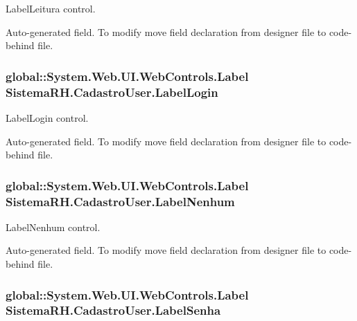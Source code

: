 LabelLeitura control. 

Auto-\/generated field. To modify move field declaration from designer file to code-\/behind file. \hypertarget{class_sistema_r_h_1_1_cadastro_user_a886a753f3edbe32db892c14f54480907}{
\subsubsection[{LabelLogin}]{\setlength{\rightskip}{0pt plus 5cm}global::System.Web.UI.WebControls.Label {\bf SistemaRH.CadastroUser.LabelLogin}}}
\label{class_sistema_r_h_1_1_cadastro_user_a886a753f3edbe32db892c14f54480907}


LabelLogin control. 

Auto-\/generated field. To modify move field declaration from designer file to code-\/behind file. \hypertarget{class_sistema_r_h_1_1_cadastro_user_a28628279d4844482bbdd9bd6343e74fd}{
\subsubsection[{LabelNenhum}]{\setlength{\rightskip}{0pt plus 5cm}global::System.Web.UI.WebControls.Label {\bf SistemaRH.CadastroUser.LabelNenhum}}}
\label{class_sistema_r_h_1_1_cadastro_user_a28628279d4844482bbdd9bd6343e74fd}


LabelNenhum control. 

Auto-\/generated field. To modify move field declaration from designer file to code-\/behind file. \hypertarget{class_sistema_r_h_1_1_cadastro_user_aa130d6fb4abf5d140e894524e5190ef3}{
\subsubsection[{LabelSenha}]{\setlength{\rightskip}{0pt plus 5cm}global::System.Web.UI.WebControls.Label {\bf SistemaRH.CadastroUser.LabelSenha}}}
\label{class_sistema_r_h_1_1_cadastro_user_aa130d6fb4abf5d140e894524e5190ef3}


